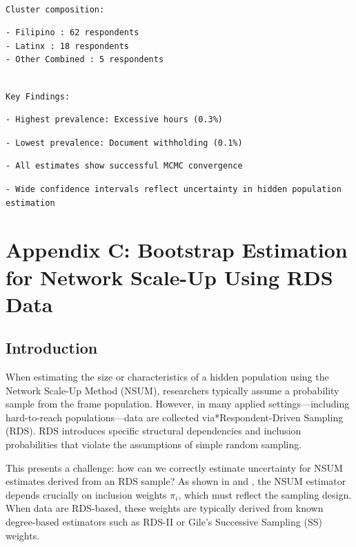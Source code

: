 \documentclass[
  12pt,
  letterpaper,
  DIV=11,
  numbers=noendperiod]{scrartcl}
\theoremstyle{plain}
\theoremstyle{definition}
\begin{document}
\begin{verbatim}

Cluster composition:
\end{verbatim}

\begin{verbatim}
- Filipino : 62 respondents
- Latinx : 18 respondents
- Other Combined : 5 respondents
\end{verbatim}

\begin{verbatim}

Key Findings:
\end{verbatim}

\begin{verbatim}
- Highest prevalence: Excessive hours (0.3%)
\end{verbatim}

\begin{verbatim}
- Lowest prevalence: Document withholding (0.1%)
\end{verbatim}

\begin{verbatim}
- All estimates show successful MCMC convergence
\end{verbatim}

\begin{verbatim}
- Wide confidence intervals reflect uncertainty in hidden population
estimation
\end{verbatim}

\section{Appendix C: Bootstrap Estimation for Network Scale-Up Using RDS
Data}\label{app-3step}

\subsection{Introduction}\label{introduction-1}

When estimating the size or characteristics of a hidden population using
the Network Scale-Up Method (NSUM), researchers typically assume a
probability sample from the frame population. However, in many applied
settings---including hard-to-reach populations---data are collected
via*Respondent-Driven Sampling (RDS). RDS introduces specific structural
dependencies and inclusion probabilities that violate the assumptions of
simple random sampling.

This presents a challenge: how can we correctly estimate uncertainty for
NSUM estimates derived from an RDS sample? As shown in
\textcite{feeh16-generalized} and \textcite{salg06-variance}, the NSUM
estimator depends crucially on inclusion weights \(\pi_i\), which must
reflect the sampling design. When data are RDS-based, these weights are
typically derived from known degree-based estimators such as RDS-II or
Gile's Successive Sampling (SS) weights.
\end{document}
